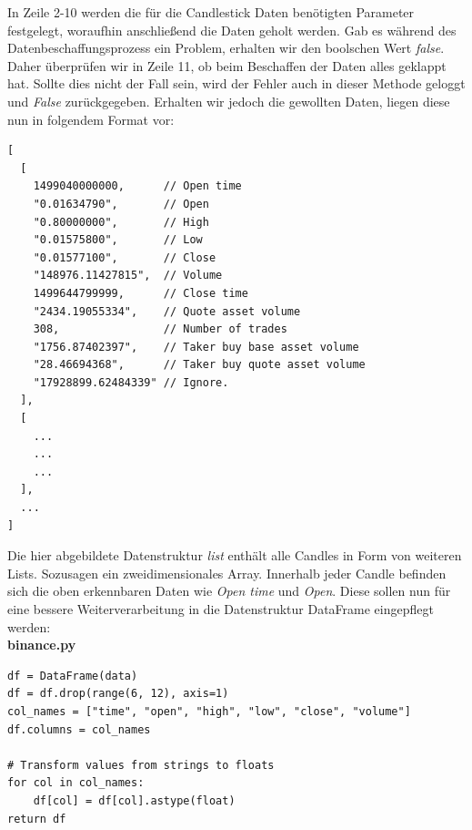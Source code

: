 \documentclass[oneside]{ausarbeitung}
\begin{document}
In Zeile 2-10 werden die für die Candlestick Daten benötigten Parameter festgelegt, woraufhin anschließend die Daten geholt werden. Gab es während des Datenbeschaffungsprozess ein Problem, erhalten wir den boolschen Wert \textit{false}. Daher überprüfen wir in Zeile 11, ob beim Beschaffen der Daten alles geklappt hat. Sollte dies nicht der Fall sein, wird der Fehler auch in dieser Methode geloggt und \textit{False} zurückgegeben. Erhalten wir jedoch die gewollten Daten, liegen diese nun in folgendem Format vor: \\

\lstset{language=Python}
\lstset{frame=lines}
\lstset{basicstyle=\footnotesize}
\begin{lstlisting}
[
  [
    1499040000000,      // Open time
    "0.01634790",       // Open
    "0.80000000",       // High
    "0.01575800",       // Low
    "0.01577100",       // Close
    "148976.11427815",  // Volume
    1499644799999,      // Close time
    "2434.19055334",    // Quote asset volume
    308,                // Number of trades
    "1756.87402397",    // Taker buy base asset volume
    "28.46694368",      // Taker buy quote asset volume
    "17928899.62484339" // Ignore.
  ],
  [
  	...
  	...
  	...
  ],
  ...
]
\end{lstlisting}

Die hier abgebildete Datenstruktur \textit{list} enthält alle Candles in Form von weiteren Lists. Sozusagen ein zweidimensionales Array. Innerhalb jeder Candle befinden sich die oben erkennbaren Daten wie \textit{Open time} und \textit{Open}. Diese sollen nun für eine bessere Weiterverarbeitung in die Datenstruktur DataFrame eingepflegt werden: \\

\lstset{language=Python}
\lstset{frame=lines}
\lstset{basicstyle=\footnotesize}
\textbf{binance.py}
\begin{lstlisting}
df = DataFrame(data)
df = df.drop(range(6, 12), axis=1)
col_names = ["time", "open", "high", "low", "close", "volume"]
df.columns = col_names

# Transform values from strings to floats
for col in col_names:
	df[col] = df[col].astype(float)
return df
\end{lstlisting}
\end{document}
